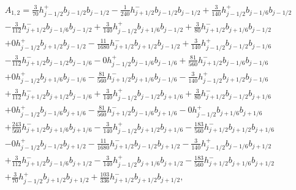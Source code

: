 \documentclass[12pt]{article}
\begin{document}
\begin{multline*} A_{1,2} = \frac{3}{70} h_{j-1/2}^+ b_{j-1/2} b_{j-1/2}-\frac{1}{240} h_{j+1/2}^- b_{j-1/2} b_{j-1/2}+\frac{3}{140} h_{j-1/2}^+ b_{j-1/6} b_{j-1/2}\\-\frac{3}{112} h_{j+1/2}^- b_{j-1/6} b_{j-1/2}+\frac{3}{140} h_{j-1/2}^+ b_{j+1/6} b_{j-1/2}+\frac{3}{80} h_{j+1/2}^- b_{j+1/6} b_{j-1/2}\\+0 h_{j-1/2}^+ b_{j+1/2} b_{j-1/2}-\frac{11}{1680} h_{j+1/2}^- b_{j+1/2} b_{j-1/2}+\frac{3}{140} h_{j-1/2}^+ b_{j-1/2} b_{j-1/6}\\-\frac{3}{112} h_{j+1/2}^- b_{j-1/2} b_{j-1/6}-0 h_{j-1/2}^+ b_{j-1/6} b_{j-1/6}+\frac{81}{560} h_{j+1/2}^- b_{j-1/6} b_{j-1/6}\\+0 h_{j-1/2}^+ b_{j+1/6} b_{j-1/6}-\frac{81}{560} h_{j+1/2}^- b_{j+1/6} b_{j-1/6}-\frac{3}{140} h_{j-1/2}^+ b_{j+1/2} b_{j-1/6}\\+\frac{3}{112} h_{j+1/2}^- b_{j+1/2} b_{j-1/6}+\frac{3}{140} h_{j-1/2}^+ b_{j-1/2} b_{j+1/6}+\frac{3}{80} h_{j+1/2}^- b_{j-1/2} b_{j+1/6}\\+0 h_{j-1/2}^+ b_{j-1/6} b_{j+1/6}-\frac{81}{560} h_{j+1/2}^- b_{j-1/6} b_{j+1/6}-0 h_{j-1/2}^+ b_{j+1/6} b_{j+1/6}\\+\frac{243}{560} h_{j+1/2}^- b_{j+1/6} b_{j+1/6}-\frac{3}{140} h_{j-1/2}^+ b_{j+1/2} b_{j+1/6}-\frac{183}{560} h_{j+1/2}^- b_{j+1/2} b_{j+1/6}\\-0 h_{j-1/2}^+ b_{j-1/2} b_{j+1/2}-\frac{11}{1680} h_{j+1/2}^- b_{j-1/2} b_{j+1/2}-\frac{3}{140} h_{j-1/2}^+ b_{j-1/6} b_{j+1/2}\\+\frac{3}{112} h_{j+1/2}^- b_{j-1/6} b_{j+1/2}-\frac{3}{140} h_{j-1/2}^+ b_{j+1/6} b_{j+1/2}-\frac{183}{560} h_{j+1/2}^- b_{j+1/6} b_{j+1/2}\\+\frac{3}{70} h_{j-1/2}^+ b_{j+1/2} b_{j+1/2}+\frac{103}{336} h_{j+1/2}^- b_{j+1/2} b_{j+1/2}, \end{multline*}
\end{document}
